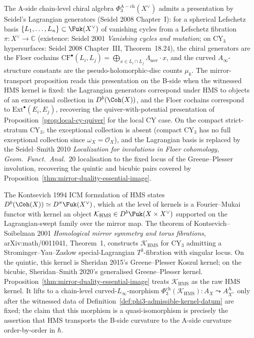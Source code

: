 \begin{remark}
\label{rem:seidel-lagrangian-presentation}
The A-side chain-level chiral algebra $\Phi_3^{\mathrm{A-ch}}(X^\vee)$ admits a presentation by Seidel's Lagrangian generators (Seidel 2008 Chapter~I): for a spherical Lefschetz basis $\{L_1, \ldots, L_n\} \subset \Fuk(X^\vee)$ of vanishing cycles from a Lefschetz fibration $\pi \colon X^\vee \to \mathbb{C}$ (existence: Seidel 2001 \textit{Vanishing cycles and mutation}; on CY$_3$ hypersurfaces: Seidel 2008 Chapter~III, Theorem~18.24), the chiral generators are the Floer cochains $\mathrm{CF}^\bullet(L_i, L_j) = \bigoplus_{x \in L_i \cap L_j} \Lambda_{\mathrm{nov}} \cdot x$, and the curved $A_\infty$-structure constants are the pseudo-holomorphic-disc counts $\mu_k$. The mirror-transport proposition reads this presentation on the B-side when the witnessed HMS kernel is fixed: the Lagrangian generators correspond under HMS to objects of an exceptional collection in $D^b(\Coh(X))$, and the Floer cochains correspond to $\mathrm{Ext}^\bullet(E_i, E_j)$, recovering the quiver-with-potential presentation of Proposition~\ref{prop:local-cy-quiver} for the local CY case. On the compact strict-stratum CY$_3$, the exceptional collection is absent (compact CY$_3$ has no full exceptional collection since $\omega_X = \mathcal{O}_X$), and the Lagrangian basis is replaced by the Seidel--Smith 2010 \textit{Localization for involutions in Floer cohomology}, \textit{Geom.~Funct.~Anal.}~20 localisation to the fixed locus of the Greene--Plesser involution, recovering the quintic and bicubic pairs covered by Proposition~\ref{thm:mirror-duality-essential-image}.
\end{remark}

\begin{remark}
\label{rem:kontsevich-hms-fourier-mukai}
The Kontsevich 1994 ICM formulation of HMS states $D^b(\Coh(X)) \simeq D^\pi\Fuk(X^\vee)$, which at the level of kernels is a Fourier--Mukai functor with kernel an object $\mathcal{K}_{\mathrm{HMS}} \in D^b\Fuk(X \times X^\vee)$ supported on the Lagrangian-swept family over the mirror map. The theorem of Kontsevich--Soibelman 2001 \textit{Homological mirror symmetry and torus fibrations}, arXiv:math/0011041, Theorem~1, constructs $\mathcal{K}_{\mathrm{HMS}}$ for CY$_3$ admitting a Strominger--Yau--Zaslow special-Lagrangian $T^3$-fibration with singular locus. On the quintic, this kernel is Sheridan 2015's Greene--Plesser Koszul kernel; on the bicubic, Sheridan--Smith 2020's generalised Greene--Plesser kernel. Proposition~\ref{thm:mirror-duality-essential-image} treats $\mathcal{K}_{\mathrm{HMS}}$ as the raw HMS kernel. It lifts to a chain-level curved-$L_\infty$-morphism $\Phi_3^{\mathrm{ch}}(\mathcal{K}_{\mathrm{HMS}}) \colon A_X \leadsto A_{X^\vee}^{\mathrm{A}}$ only after the witnessed data of Definition~\ref{def:phi3-admissible-kernel-datum} are fixed; the claim that this morphism is a quasi-isomorphism is precisely the assertion that HMS transports the B-side curvature to the A-side curvature order-by-order in $\hbar$.
\end{remark}

